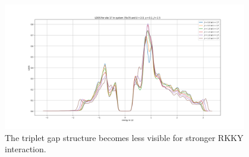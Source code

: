 \begin{figure}[H]
    \centering
    \includegraphics[width=0.95\textwidth]{Images/rkky_35x35_ldos.png}
    \caption{The triplet gap structure becomes less visible for stronger RKKY interaction.}
    \label{fig:ldos_rkky_stronger}
\end{figure}

